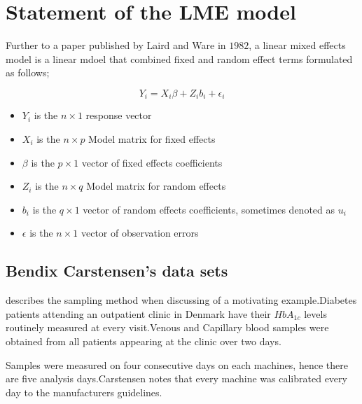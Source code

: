 \documentclass[12pt, a4paper]{report}
\theoremstyle{plain}
\theoremstyle{definition}
\theoremstyle{remark}
\begin{document}
\section{Statement of the LME model}

Further to a paper published by Laird and Ware in $1982$, a linear mixed effects model is a linear mdoel that combined fixed and random effect terms formulated as follows;

\begin{displaymath}
Y_{i} =X_{i}\beta + Z_{i}b_{i} + \epsilon_{i}
\end{displaymath}
\begin{itemize}
	
	\item $Y_{i}$ is the $n \times 1$ response vector \item $X_{i}$ is
	the $n \times p$ Model matrix for fixed effects \item $\beta$ is
	the $p \times 1$ vector of fixed effects coefficients \item
	$Z_{i}$ is the $n \times q$ Model matrix for random effects \item
	$b_{i}$ is the $q \times 1$ vector of random effects coefficients,
	sometimes denoted as $u_{i}$ \item $\epsilon$ is the $n \times 1$
	vector of observation errors
\end{itemize}








\subsection{Bendix Carstensen's data sets}
\citet{bxc2008}describes the sampling method when discussing of a motivating example.Diabetes patients attending an outpatient clinic in Denmark have their $HbA_{1c}$ levels routinely measured at every visit.Venous and Capillary blood samples were obtained from all patients appearing at the clinic over two days.

Samples were measured on four consecutive days on each machines, hence there are five analysis days.Carstensen notes that every machine was calibrated every day to  the manufacturers guidelines.



\end{document}
